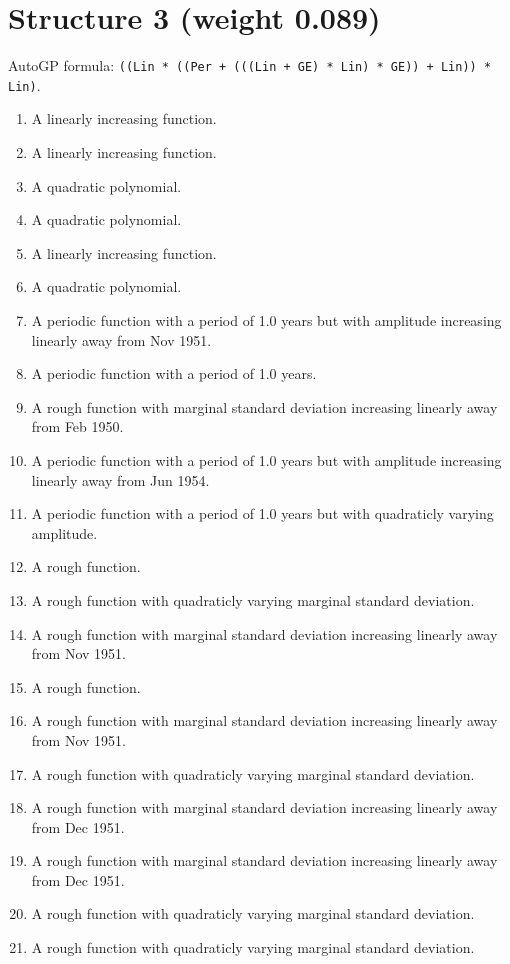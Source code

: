 \documentclass[11pt,a4paper]{article}
\begin{document}
\section*{Structure 3 (weight 0.089)}

AutoGP formula: \texttt{((Lin * ((Per + (((Lin + GE) * Lin) * GE)) + Lin)) * Lin)}.
\begin{enumerate}
  \item A linearly increasing function.
  \item A linearly increasing function.
  \item A quadratic polynomial.
  \item A quadratic polynomial.
  \item A linearly increasing function.
  \item A quadratic polynomial.
  \item A periodic function with a period of 1.0 years but with amplitude increasing linearly away from Nov 1951.
  \item A periodic function with a period of 1.0 years.
  \item A rough function with marginal standard deviation increasing linearly away from Feb 1950.
  \item A periodic function with a period of 1.0 years but with amplitude increasing linearly away from Jun 1954.
  \item A periodic function with a period of 1.0 years but with quadraticly varying amplitude.
  \item A rough function.
  \item A rough function with quadraticly varying marginal standard deviation.
  \item A rough function with marginal standard deviation increasing linearly away from Nov 1951.
  \item A rough function.
  \item A rough function with marginal standard deviation increasing linearly away from Nov 1951.
  \item A rough function with quadraticly varying marginal standard deviation.
  \item A rough function with marginal standard deviation increasing linearly away from Dec 1951.
  \item A rough function with marginal standard deviation increasing linearly away from Dec 1951.
  \item A rough function with quadraticly varying marginal standard deviation.
  \item A rough function with quadraticly varying marginal standard deviation.

\end{enumerate}
\end{document}
